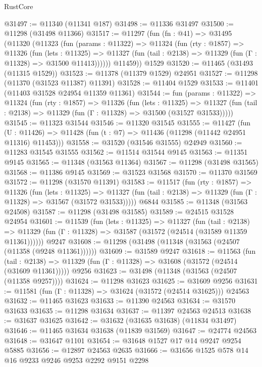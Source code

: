 \begin{lexlean}{RustCore}
\begin{coremodule}
@31497 := @11340 (@11341 @187)
@31498 := @11336 @31497
@31500 := @11298 (@31498 @11366)
@31517 := @11297
    (fun (fn : @41) =>
    @31495
      (@11320
        (@11323
          (fun (params : @11322) =>
          @11324
            (fun (rty : @1857) =>
            @11326
              (fun (lets : @11325) =>
              @11327 (fun (tail : @2138) => @11329 (fun (Γ : @11328) => @31500 @11413))))))
        @11459))
    @1529
@31520 := @11465 (@31493 (@11315 @1529))
@31523 := @11378 (@11379 @1529) @24951
@31527 := @11298 (@11370 (@31523 @11387) @11391)
@31528 := @11404 @1529
@31533 := @11401 (@11403 @31528 @24954 @11359 @11361)
@31544 := fun (params : @11322) =>
  @11324
    (fun (rty : @1857) =>
    @11326
      (fun (lets : @11325) =>
      @11327 (fun (tail : @2138) => @11329 (fun (Γ : @11328) => @31500 (@31527 @31533)))))
@31545 := @11323 @31544
@31546 := @11320 @31545
@31555 := @11427
    (fun (U : @11426) => @11428 (fun (t : @7) => @11436 (@11298 (@11442 @24951 @11316) @11453)))
@31558 := @31520 (@31546 @31555) @24949
@31560 := @11283 @31545 @31555
@31562 := @11514 @31544 @9145
@31563 := @11351 @9145
@31565 := @11348 (@31563 @11364)
@31567 := @11298 (@31498 @31565)
@31568 := @11386 @9145
@31569 := @31523 @31568
@31570 := @11370 @31569
@31572 := @11298 (@31570 @11391)
@31583 := @11517
    (fun (rty : @1857) =>
    @11326
      (fun (lets : @11325) =>
      @11327 (fun (tail : @2138) => @11329 (fun (Γ : @11328) => @31567 (@31572 @31533)))))
    @6844
@31585 := @11348 (@31563 @24508)
@31587 := @11298 (@31498 @31585)
@31589 := @24515 @31528 @24954
@31601 := @11539
    (fun (lets : @11325) =>
    @11327
      (fun (tail : @2138) =>
      @11329 (fun (Γ : @11328) => @31587 (@31572 (@24514 (@31589 @11359 @11361))))))
    @9247
@31608 := @11298 (@31498 (@11348 (@31563 (@24507 (@11358 (@9248 @11361))))))
@31609 := @31589 @9247
@31618 := @11563
    (fun (tail : @2138) => @11329 (fun (Γ : @11328) => @31608 (@31572 (@24514 (@31609 @11361)))))
    @9256
@31623 := @31498 (@11348 (@31563 (@24507 (@11358 @9257))))
@31624 := @11298 @31623
@31625 := @31609 @9256
@31631 := @11581 (fun (Γ : @11328) => @31624 (@31572 (@24514 @31625))) @24563
@31632 := @11465 @31623
@31633 := @11390 @24563
@31634 := @31570 @31633
@31635 := @11298 @31634
@31637 := @11397 @24563 @24513
@31638 := @31637 @31625
@31642 := @31632 (@31635 @31638) (@11834 @31497)
@31646 := @11465 @31634 @31638 (@11839 @31569)
@31647 := @24774 @24563
@31648 := @31647 @1101
@31654 := @31648 @1527 @17 @14 @9247 @9254 @5885
@31656 := @12897 @24563 @2635
@31666 := @31656 @1525 @578 @14 @16 @9233 @9246 @9253 @2292 @9151 @2298

\end{coremodule}
\end{lexlean}
